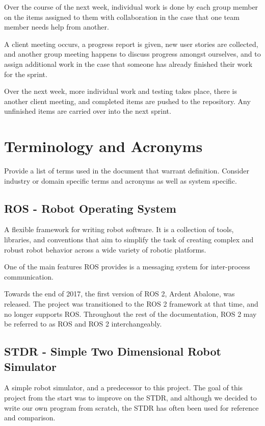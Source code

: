Over the course of the next week, individual work is done by each group member on the items assigned to them with collaboration in the case that one team member needs help from another.

A client meeting occurs, a progress report is given, new user stories are collected, and another group meeting happens to discuss progress amongst ourselves, and to assign additional work in the case that someone has already finished their work for the sprint.

Over the next week, more individual work and testing takes place, there is another client meeting, and completed items are pushed to the repository. Any unfinished items are carried over into the next sprint.

\section{Terminology and Acronyms}
Provide a list of terms used in the document that warrant definition.  Consider 
industry or domain specific terms and acronyms as well as system specific. 

\subsection{ROS - Robot Operating System}
A flexible framework for writing robot software. It is a collection of tools, libraries, and conventions that aim to simplify the task of creating complex and robust robot behavior across a wide variety of robotic platforms.

One of the main features ROS provides is a messaging system for inter-process communication.

Towards the end of 2017, the first version of ROS 2, Ardent Abalone, was released. The project was transitioned to the ROS 2 framework at that time, and no longer supports ROS. Throughout the rest of the documentation, ROS 2 may be referred to as ROS and ROS 2 interchangeably.

\subsection{STDR - Simple Two Dimensional Robot Simulator}
A simple robot simulator, and a predecessor to this project. The goal of this project from the start was to improve on the STDR, and although we decided to write our own program from scratch, the STDR has often been used for reference and comparison.

